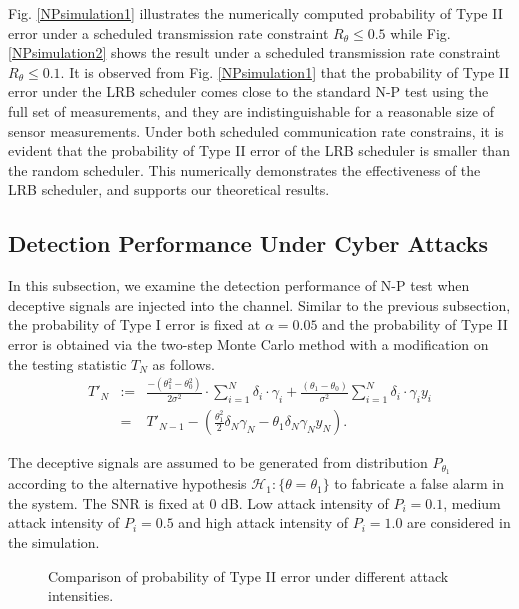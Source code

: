 \documentclass[journal]{IEEEtran}
\def\cH{\mathcal{H}}
\def\beq{\begin{eqnarray}}
\def\enq{\end{eqnarray}}
\begin{document}
Fig. \ref{NPsimulation1} illustrates the numerically computed probability of Type II error under a scheduled transmission rate constraint $R_{\theta}\leqslant0.5$ while Fig. \ref{NPsimulation2} shows the result under a scheduled transmission rate constraint $R_{\theta}\leqslant0.1$. It is observed from Fig. \ref{NPsimulation1} that the probability of Type II error under the LRB scheduler comes close to the standard N-P test using the full set of measurements, and they are indistinguishable for a reasonable size of sensor measurements. Under both scheduled communication rate constrains, it is evident that the probability of Type II error of the LRB scheduler is smaller than the random scheduler. This numerically demonstrates the effectiveness of the LRB scheduler, and supports our theoretical results.

\subsection{Detection Performance Under Cyber Attacks}
In this subsection, we examine the detection performance of N-P test when deceptive signals are injected into the channel.
Similar to the previous subsection, the probability of Type I error is fixed at $\alpha=0.05$ and the probability of Type II error is obtained via the two-step Monte Carlo method with a modification on the testing statistic $T_N$ as follows.
\beq\label{dataset_attack}
T'_N&:=&  \frac{{ - (\theta _1^2 - \theta _0^2)}}{{2{\sigma ^2}}} \cdot \sum\limits_{i = 1}^N {{\delta_i\cdot \gamma_{i}}}  + \frac{{({\theta _1} - {\theta _0})}}{{{\sigma ^2}}}\sum\limits_{i = 1}^N {{\delta_i\cdot \gamma_{i}y_i}}\nonumber\\
&=&T'_{N-1}-\left(\frac{\theta _1^2}{2}\delta_N\gamma_N-{\theta_1}\delta_N\gamma_Ny_N\right).
\enq

The deceptive signals are assumed to be generated from distribution $P_{\theta_1}$ according to the alternative hypothesis $\cH_1:\{\theta=\theta_1\}$ to fabricate a false alarm in the system. The SNR is fixed at $0$ dB. Low attack intensity of $P_i=0.1$,  medium attack intensity of $P_i=0.5$ and high attack intensity of $P_i=1.0$ are considered in the simulation.

\begin{figure*}
\centering
{}
\caption{ Comparison of probability of Type II error under different attack intensities.}
\label{Attack_simulation}
\end{figure*}
\end{document}
